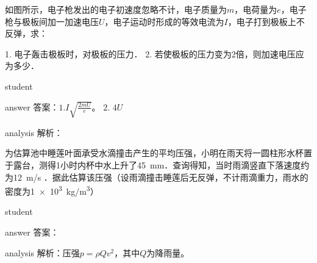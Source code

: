 \begin{example}
	如图所示，电子枪发出的电子初速度忽略不计，电子质量为$ m $，电荷量为$ e $，电子枪与极板间加一加速电压$ U $，电子运动时形成的等效电流为$ I $，电子打到极板上不反弹，求：
	
	1. 电子轰击极板时，对极板的压力．
	2. 若使极板的压力变为2倍，则加速电压应为多少．
	
	
	\begin{taggedblock}{student}
		\vspace*{2cm}
	\end{taggedblock}
	
	
	\begin{taggedblock}{answer}
		答案：$ 1.I\sqrt{\frac{2mU}{e}} $。 2. $ 4U $
	\end{taggedblock}
	
	
	\begin{taggedblock}{analysis}
		解析：
	\end{taggedblock}
\end{example}


\begin{example}
	为估算池中睡莲叶面承受水滴撞击产生的平均压强，小明在雨天将一圆柱形水杯置于露台，测得1小时内杯中水上升了\SI{45}{mm}．查询得知，当时雨滴竖直下落速度约为\SI{12}{m/s} ．据此估算该压强（设雨滴撞击睡莲后无反弹，不计雨滴重力，雨水的密度为\SI{1e3}{kg/m^3}）
	
	\begin{taggedblock}{student}
		\vspace*{2cm}
	\end{taggedblock}
	
	
	\begin{taggedblock}{answer}
		答案：
	\end{taggedblock}
	
	
	\begin{taggedblock}{analysis}
		解析：压强$ p = \rho Qv^2 $，其中$ Q $为降雨量。
	\end{taggedblock}
\end{example}

